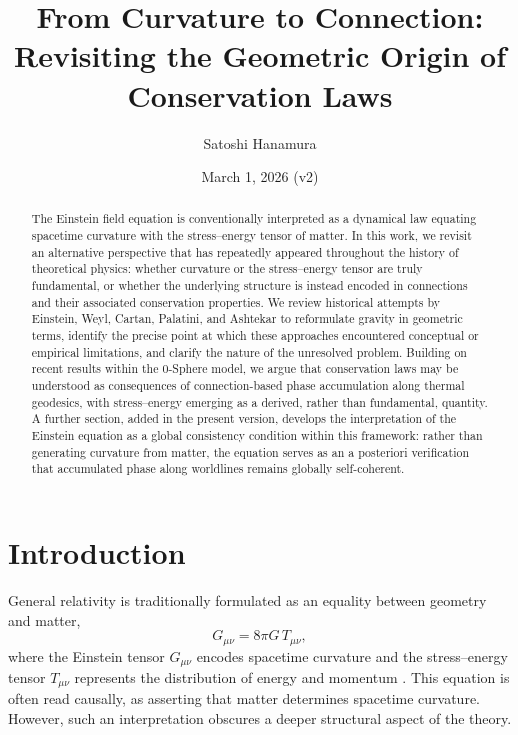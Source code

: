 \documentclass[%
 reprint,
 amsmath,amssymb,
 aps,
 prb,
]{revtex4-2}
\numberwithin{equation}{section}
\begin{document}
\title{From Curvature to Connection:\\
Revisiting the Geometric Origin of Conservation Laws}

\author{Satoshi Hanamura}
\date{March 1, 2026 (v2)}

\begin{abstract}
The Einstein field equation is conventionally interpreted as a dynamical law equating spacetime curvature with the stress--energy tensor of matter. In this work, we revisit an alternative perspective that has repeatedly appeared throughout the history of theoretical physics: whether curvature or the stress--energy tensor are truly fundamental, or whether the underlying structure is instead encoded in connections and their associated conservation properties. We review historical attempts by Einstein, Weyl, Cartan, Palatini, and Ashtekar to reformulate gravity in geometric terms, identify the precise point at which these approaches encountered conceptual or empirical limitations, and clarify the nature of the unresolved problem. Building on recent results within the 0-Sphere model, we argue that conservation laws may be understood as consequences of connection-based phase accumulation along thermal geodesics, with stress--energy emerging as a derived, rather than fundamental, quantity. A further section, added in the present version, develops the interpretation of the Einstein equation as a global consistency condition within this framework: rather than generating curvature from matter, the equation serves as an a posteriori verification that accumulated phase along worldlines remains globally self-coherent.
\end{abstract}

\maketitle

\section{Introduction}
\label{sec:introduction}

General relativity is traditionally formulated as an equality between geometry and matter,
\begin{equation}
G_{\mu\nu} = 8\pi G\, T_{\mu\nu},
\end{equation}
where the Einstein tensor $G_{\mu\nu}$ encodes spacetime curvature and the stress--energy tensor $T_{\mu\nu}$ represents the distribution of energy and momentum \cite{Einstein1915,MTW,Wald}. This equation is often read causally, as asserting that matter determines spacetime curvature. However, such an interpretation obscures a deeper structural aspect of the theory.
\end{document}
